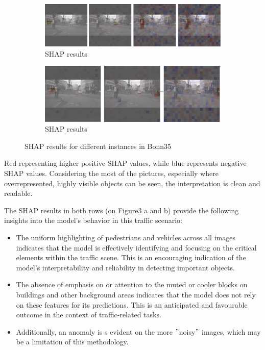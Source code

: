 \begin{figure}[h]
    \centering
    \begin{subfigure}[b]{\textwidth}
        \includegraphics[width=\textwidth]{figures/output1}
        \caption{SHAP results}\label{fig:SHAP_results11}
    \end{subfigure}
    \hfill
    \begin{subfigure}[b]{\textwidth}
        \includegraphics[width=\textwidth]{figures/output1,2}
        \caption{SHAP results}\label{fig:SHAP_results12}
    \end{subfigure}
    \hfill
    \caption{SHAP results for different instances in Bonn35}
    \label{fig:SHAP_result}
\end{figure}


Red representing higher positive SHAP values, while blue represents negative SHAP values.
Considering the most of the pictures, especially where overrepresented, highly visible objects can be seen, the interpretation is clean and readable.


The SHAP results in both rows (on Figure\ref{fig:SHAP_result} a and b) provide the following insights into the model's behavior in this traffic scenario:

\begin{itemize}
\item The uniform highlighting of pedestrians and vehicles across all images indicates that the model is effectively identifying and focusing on the critical elements within the traffic scene. This is an encouraging indication of the model's interpretability and reliability in detecting important objects.
\item The absence of emphasis on or attention to the muted or cooler blocks on buildings and other background areas indicates that the model does not rely on these features for its predictions. This is an anticipated and favourable outcome in the context of traffic-related tasks.
\item Additionally, an anomaly is s evident on the more \("\)noisy\("\) images, which may be a limitation of this methodology.
\end{itemize}




